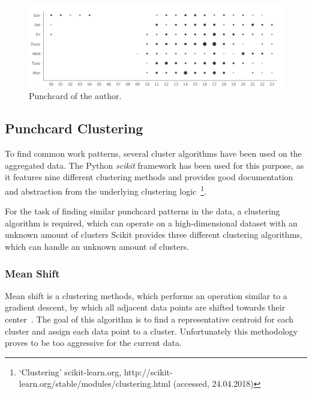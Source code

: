 \begin{figure}[H]
    \includegraphics[scale=0.32]{./graphs/analysis/ordered-punchcard}
    \centering
    \caption{Punchcard of the author.}\label{fig:working-hour-rhythm-author}
\end{figure}


\subsection{Punchcard Clustering}

To find common work patterns, several cluster algorithms have been used on the aggregated data.
The Python \emph{scikit} framework has been used for this purpose, as it features nine different clustering methods and provides good documentation and abstraction from the underlying clustering logic~\footnote{`Clustering' scikit-learn.org, http://scikit-learn.org/stable/modules/clustering.html (accessed, 24.04.2018)}.

For the task of finding similar punchcard patterns in the data, a clustering algorithm is required, which can operate on a high-dimensional dataset with an unknown amount of clusters
Scikit provides three different clustering algorithms, which can handle an unknown amount of clusters.

\subsubsection{Mean Shift}\label{mean-shift}
Mean shift is a clustering methods, which performs an operation similar to a gradient descent, by which all adjacent data points are shifted towards their center~\cite{article:mean-shift}.
The goal of this algorithm is to find a representative centroid for each cluster and assign each data point to a cluster.
Unfortunately this methodology proves to be too aggressive for the current data.

